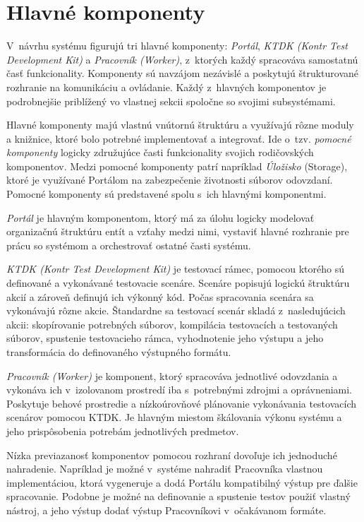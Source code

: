 \documentclass[
  digital, %
  oneside, %
  table,   %
  lof,     %
  lot,   %
]{fithesis3}
\begin{document}
\section{Hlavné komponenty}

V~návrhu systému figurujú tri hlavné komponenty: \emph{Portál}, \emph{KTDK (Kontr Test Development Kit)} a \emph{Pracovník (Worker)}, z~ktorých každý spracováva samostatnú časť funkcionality. Komponenty sú navzájom nezávislé a poskytujú štrukturované rozhranie na komunikáciu a ovládanie. Každý z~hlavných komponentov je podrobnejšie priblížený vo vlastnej sekcii spoločne so svojimi subsystémami.

Hlavné komponenty majú vlastnú vnútornú štruktúru a využívajú rôzne moduly a knižnice, ktoré bolo potrebné implementovať a integrovať. Ide o~tzv. \emph{pomocné komponenty} logicky združujúce časti funkcionality svojich rodičovských komponentov. Medzi pomocné komponenty patrí napríklad \textit{Úložisko} (Storage), ktoré je využívané Portálom na zabezpečenie životnosti súborov odovzdaní. Pomocné komponenty sú predstavené spolu s~ich hlavnými komponentmi.

\emph{Portál} je hlavným komponentom, ktorý má za úlohu logicky modelovať organizačnú štruktúru entít a vzťahy medzi nimi, vystaviť hlavné rozhranie pre prácu so systémom a orchestrovať ostatné časti systému. 

\emph{KTDK (Kontr Test Development Kit)} je testovací rámec, pomocou ktorého sú definované a vykonávané testovacie scenáre. Scenáre popisujú logickú štruktúru akcií a zároveň definujú ich výkonný kód. Počas spracovania scenára sa vykonávajú rôzne akcie. Štandardne sa testovací scenár skladá z~nasledujúcich akcii: skopírovanie potrebných súborov, kompilácia testovacích a testovaných súborov, spustenie testovacieho rámca, vyhodnotenie jeho výstupu a jeho transformácia do definovaného výstupného formátu. 

\emph{Pracovník (Worker)} je komponent, ktorý spracováva jednotlivé odovzdania a vykonáva ich v~izolovanom prostredí iba s~potrebnými zdrojmi a oprávneniami. Poskytuje behové prostredie a nízkoúrovňové plánovanie vykonávania testovacích scenárov pomocou KTDK. Je hlavným miestom škálovania výkonu systému a jeho prispôsobenia potrebám jednotlivých predmetov.

Nízka previazanosť komponentov pomocou rozhraní dovoľuje ich jednoduché nahradenie. Napríklad je možné v~systéme nahradiť Pracovníka vlastnou implementáciou, ktorá vygeneruje a dodá Portálu kompatibilný výstup pre ďalšie spracovanie. Podobne je možné na definovanie a spustenie testov použiť vlastný nástroj, a jeho výstup dodať výstup Pracovníkovi v~očakávanom formáte.
\end{document}
